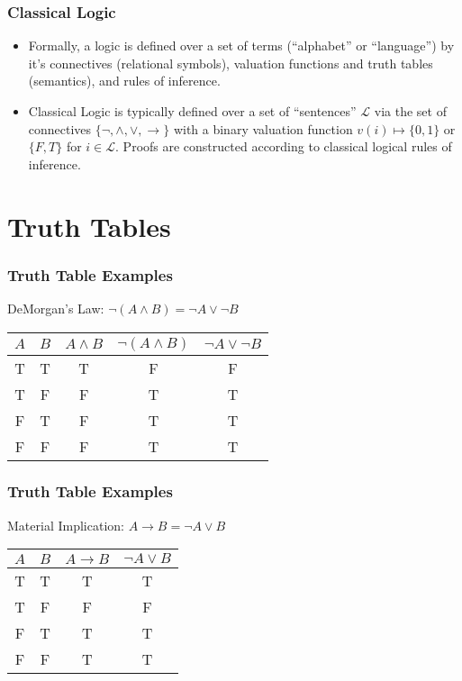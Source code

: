 \documentclass{beamer}
\begin{document}
\frame
{
\frametitle{Classical Logic}

\begin{itemize}
    \item<1-> Formally, a logic is defined over a set of terms (``alphabet'' or ``language'') by it's connectives (relational symbols), valuation functions and truth tables (semantics), and rules of inference. 
    \item<2-> Classical Logic is typically defined over a set of ``sentences'' $\mathcal{L}$ via the set of connectives $\{ \lnot, \land, \lor, \rightarrow \}$ with a binary valuation function $v(i) \mapsto \{0,1\} $ or $\{F,T\}$ for $i \in \mathcal{L}$.  Proofs are constructed according to classical logical rules of inference.
\end{itemize}


}



\section{Truth Tables}
\frame
{
\frametitle{Truth Table Examples}

\begin{center}
    
DeMorgan's Law: $\lnot (A \land B) = \lnot A \lor \lnot B$

\vspace{1cm}

\begin{tabular}{c|c|c|c|c}
$A$ & $B$ & $A\land B$ & $\lnot (A \land B)$ & $\lnot A\lor \lnot B$\\
\midrule
T & T & T & F & F \\
T & F & F & T & T \\
F & T & F & T & T \\
F & F & F & T & T 
\end{tabular}

\end{center}

}

\frame
{
\frametitle{Truth Table Examples}

\begin{center}
Material Implication: $A \rightarrow B = \lnot A \lor B$

\vspace{1cm}

\begin{tabular}{c|c|c|c}
   $A$  & $B$ & $A\to B$ & $\lnot A \lor B$ \\
   \midrule
    T & T & T & T \\
    T & F & F & F \\
    F & T & T & T \\
    F & F & T & T
\end{tabular}

\end{center}


}
\end{document}
